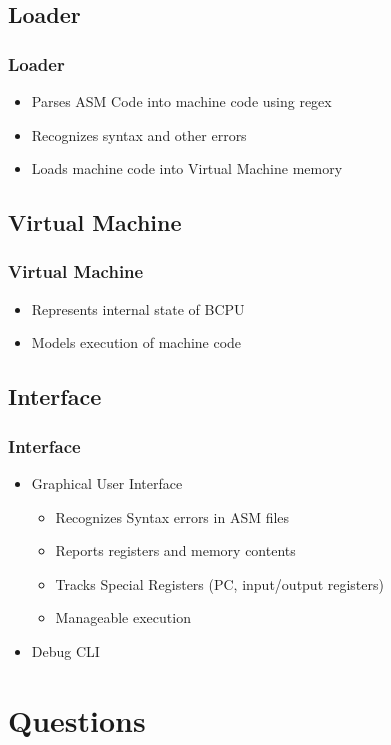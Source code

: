\subsection{Loader}
\begin{frame}
	\frametitle{Loader}
	\begin{itemize}
	\item Parses ASM Code into machine code using regex
	\item Recognizes syntax and other errors
	\item Loads machine code into Virtual Machine memory
	\end{itemize}
\end{frame}

\subsection{Virtual Machine}
\begin{frame}
	\frametitle{Virtual Machine}
	\begin{itemize}
	\item Represents internal state of BCPU
	\item Models execution of machine code
	\end{itemize}
\end{frame}

\subsection{Interface}
\begin{frame}
	\frametitle{Interface}
	\begin{itemize}
	\item Graphical User Interface
		\begin{itemize}
		\item Recognizes Syntax errors in ASM files
		\item Reports registers and memory contents
		\item Tracks Special Registers (PC, input/output registers)
		\item Manageable execution
		\end{itemize}
	\item Debug CLI
	\end{itemize}
\end{frame}

\section{Questions}

